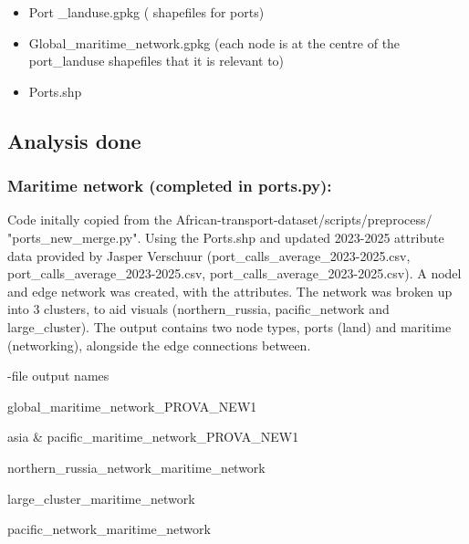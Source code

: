 \documentclass[11pt,a4paper]{article}
\begin{document}
\begin{itemize}
\item Port \_landuse.gpkg ( shapefiles for ports)
\end{itemize}

\begin{itemize}
\item Global\_maritime\_network.gpkg (each node is at the centre of the port\_landuse shapefiles that it is relevant to)
\end{itemize}

\begin{itemize}
\item Ports.shp
\end{itemize}

\subsection{Analysis done}

\subsubsection{Maritime network (completed in ports.py):}

Code initally copied from the African-transport-dataset/scripts/preprocess/ "ports\_new\_merge.py". Using the Ports.shp and updated 2023-2025 attribute data provided by Jasper Verschuur (port\_calls\_average\_2023-2025.csv, port\_calls\_average\_2023-2025.csv, port\_calls\_average\_2023-2025.csv). A nodel and edge network was created, with the attributes. The network was broken up into 3 clusters, to aid visuals (northern\_russia, pacific\_network and large\_cluster). The output contains two node types, ports (land) and maritime (networking), alongside the edge connections between.\par

-file output names\par

global\_maritime\_network\_PROVA\_NEW1\par

asia \& pacific\_maritime\_network\_PROVA\_NEW1\par

northern\_russia\_network\_maritime\_network\par

large\_cluster\_maritime\_network\par

pacific\_network\_maritime\_network\par
\end{document}
